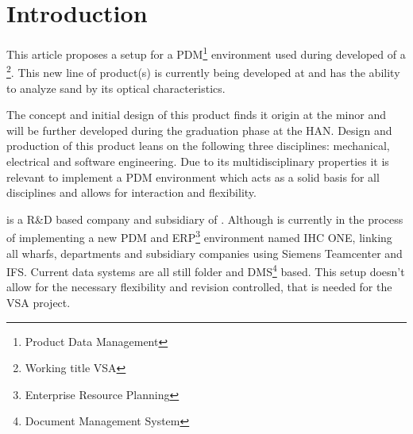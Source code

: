 \documentclass[fleqn,10pt]{SelfArx} %
\affiliation{\textsuperscript{1}\textit{Department of Engineering, HAN University of Applied Sciences, Arnhem, the Netherlands}} %
\affiliation{*\textbf{Corresponding author}: \href{mailto:spijker.jelle@gmail.com}{\color{color1}spijker.jelle@gmail.com}} %
\begin{document}
\flushbottom %

\maketitle %

\tableofcontents %

\thispagestyle{empty} %


\section*{Introduction} %

This article proposes a setup for a PDM\footnote{Product Data Management} environment used during developed of a \vsa\footnote{Working title VSA}. This new line of product(s) is currently being developed at \mti and has the ability to analyze sand by its optical characteristics. 

The concept and initial design of this product finds it origin at the minor \evd and will be further developed during the graduation phase \wtb at the HAN. Design and production of this product leans on the following three disciplines: mechanical, electrical and software engineering. Due to its multidisciplinary properties it is relevant to implement a PDM environment which acts as a solid basis for all disciplines and allows for interaction and flexibility.

\mti is a R\&D based company and subsidiary of \ihc. Although \ihc is currently in the process of implementing a new PDM and ERP\footnote{Enterprise Resource Planning} environment named IHC ONE, linking all wharfs, departments and subsidiary companies using Siemens Teamcenter and IFS. Current data systems are all still folder and DMS\footnote{Document Management System} based. This setup doesn't allow for the necessary flexibility and revision controlled, that is needed for the VSA project.
\end{document}
